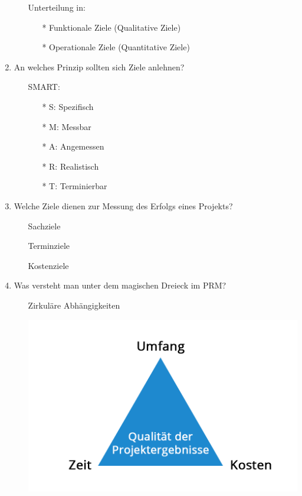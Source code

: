 \documentclass[12pt,a4paper]{article}
\begin{document}
\begin{enumerate}
\begin{enumerate}
		\item[] Unterteilung in: 
			\begin{enumerate}
			\item[*] Funktionale Ziele (Qualitative Ziele)
			\item[*] Operationale Ziele (Quantitative Ziele)
			\end{enumerate}
		\end{enumerate}
	\item An welches Prinzip sollten sich Ziele anlehnen?
		\begin{enumerate}
		\item[] SMART: 
			\begin{enumerate}
			\item[*] S: Spezifisch
			\item[*] M: Messbar
			\item[*] A: Angemessen
			\item[*] R: Realistisch
			\item[*] T: Terminierbar
			\end{enumerate}
		\end{enumerate}
	\item Welche Ziele dienen zur Messung des Erfolgs eines Projekts?
		\begin{enumerate}
		\item[] Sachziele
		\item[] Terminziele
		\item[] Kostenziele
		\end{enumerate}
	\item Was versteht man unter dem magischen Dreieck im PRM?
		\begin{enumerate}
		\item[] Zirkuläre Abhängigkeiten
		\item[] \includegraphics[scale=0.3]{Bilder/magischesDreieck.PNG}

\end{enumerate}
\end{enumerate}
\end{document}
